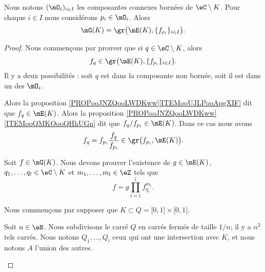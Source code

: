 \begin{lemma}     \label{LEMooEJRMooNJhMov}
    Nous notons \( (\mO_i)_{i\in I}\) les composantes connexes bornées de \( \eC\setminus K\). Pour chaque \( i\in I\) nous considérons \( p_i\in\mO_i\). Alors 
    \begin{equation}
        \mG(K)=\gr\big( \mE(K),\{ f_{p_i} \}_{i\in I} \big).
    \end{equation}
\end{lemma}

\begin{proof}
    Nous commençons par prouver que si \( q\in\eC\setminus K\), alors
    \begin{equation}
        f_q\in\gr\big( \mE(K),\{ f_{p_i} \}_{i\in I} \big).
    \end{equation}
    Il y a deux possibilités : soit \( q\) est dans la composante non bornée, soit il est dans un des \( \mO_i\).
    \begin{subproof}
        Alors la proposition \ref{PROPooJNZQooLWDKww}\ref{ITEMooUJLPooApgXIF} dit que \( f_q\in\mE(K)\).
        \spitem[Si \( q\in\mO_i\)]
        Alors la proposition \ref{PROPooJNZQooLWDKww}\ref{ITEMooQMKOooQHhUGn} dit que \( f_q/f_{p_i}\in\mE(K)\). Dans ce cas nous avons
        \begin{equation}
            f_q=f_{p_i}\frac{ f_q }{ f_{p_i} }\in\gr\big( f_{p_i},\mE(K) \big).
        \end{equation}
    \end{subproof}
    Soit \( f\in\mG(K)\). Nous devons prouver l'existence de \( g\in\mE(K)\), \( q_1,\ldots, q_l\in\eC\setminus K\) et \( m_1,\ldots, m_l\in \eZ\) tels que
    \begin{equation}
        f=g\prod_{i=1}^lf_{q_i}^{m_i}.
    \end{equation}
    
    Nous commençons par supposer que \( K\subset Q=\mathopen[ 0 , 1 \mathclose]\times\mathopen[ 0 , 1 \mathclose]\).
    \begin{subproof}
        Soit \( n\in \eN\). Nous subdivisons le carré \( Q\) en carrés fermés de taille \( 1/n\); il y a \( n^2\) tels carrés. Nous notons \( Q_1,\ldots, Q_l\) ceux qui ont une intersection avec \( K\), et nous notons \( A\) l'union des autres.


\end{subproof}
\end{proof}

